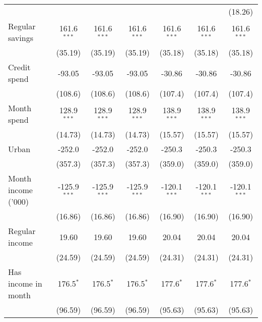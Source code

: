 \begin{table}[htbp]
\begin{footnotesize}
\begin{tabular}{lcccccc}
                                          &                &                &                &                 &                  & (18.26)\\
         Regular savings                  & 161.6$^{***}$  & 161.6$^{***}$  & 161.6$^{***}$  & 161.6$^{***}$   & 161.6$^{***}$    & 161.6$^{***}$\\
                                          & (35.19)        & (35.19)        & (35.19)        & (35.18)         & (35.18)          & (35.18)\\
         Credit spend                     & -93.05         & -93.05         & -93.05         & -30.86          & -30.86           & -30.86\\
                                          & (108.6)        & (108.6)        & (108.6)        & (107.4)         & (107.4)          & (107.4)\\
         Month spend                      & 128.9$^{***}$  & 128.9$^{***}$  & 128.9$^{***}$  & 138.9$^{***}$   & 138.9$^{***}$    & 138.9$^{***}$\\
                                          & (14.73)        & (14.73)        & (14.73)        & (15.57)         & (15.57)          & (15.57)\\
         Urban                            & -252.0         & -252.0         & -252.0         & -250.3          & -250.3           & -250.3\\
                                          & (357.3)        & (357.3)        & (357.3)        & (359.0)         & (359.0)          & (359.0)\\
         Month income ('000)              & -125.9$^{***}$ & -125.9$^{***}$ & -125.9$^{***}$ & -120.1$^{***}$  & -120.1$^{***}$   & -120.1$^{***}$\\
                                          & (16.86)        & (16.86)        & (16.86)        & (16.90)         & (16.90)          & (16.90)\\
         Regular income                   & 19.60          & 19.60          & 19.60          & 20.04           & 20.04            & 20.04\\
                                          & (24.59)        & (24.59)        & (24.59)        & (24.31)         & (24.31)          & (24.31)\\
         Has income in month              & 176.5$^{*}$    & 176.5$^{*}$    & 176.5$^{*}$    & 177.6$^{*}$     & 177.6$^{*}$      & 177.6$^{*}$\\
                                          & (96.59)        & (96.59)        & (96.59)        & (95.63)         & (95.63)          & (95.63)\\

\end{tabular}
\end{footnotesize}
\end{table}

